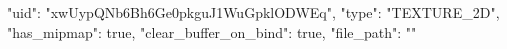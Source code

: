 {
    "uid": "xwUypQNb6Bh6Ge0pkguJ1WuGpklODWEq",
    "type": "TEXTURE_2D",
    "has_mipmap": true,
    "clear_buffer_on_bind": true,
    "file_path": ""
}